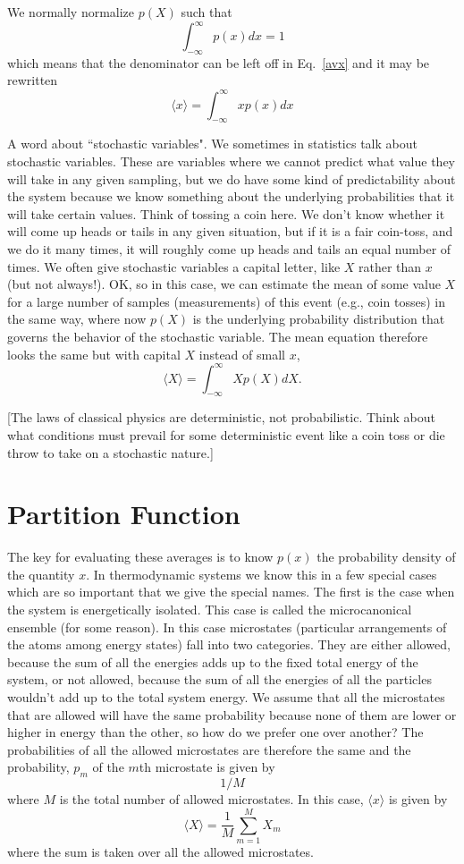 \documentclass[]{revtex4}
\newcommand{\sm}[1]{{\[#1\]}}
\begin{document}
We normally normalize $p(X)$ such that
\sm{\int_{-\infty}^{\infty} p(x)dx=1}
which means that the denominator can be left off in Eq.~\ref{avx} and it may be rewritten
\sm{\langle x\rangle={\int_{-\infty}^{\infty} xp(x)dx}}

A word about ``stochastic variables".  We sometimes in statistics talk about stochastic variables.  These are variables where we cannot predict
what value they will take in any given sampling, but we do have some kind of predictability about the system because we know something about the
underlying probabilities that it will take certain values.  Think of tossing a coin here.  We don't know whether it will come up heads or tails
in any given situation, but if it is a fair coin-toss, and we do it many times, it will roughly come up heads and tails an equal number of times.
We often give stochastic variables a capital letter, like $X$ rather than $x$ (but not always!). OK, so in this case, we can estimate the mean of
some value $X$ for a large number of samples (measurements) of this event (e.g., coin tosses) in the same way, where now $p(X)$ is the underlying
probability distribution that governs the behavior of the stochastic variable. The mean equation therefore looks the same but with capital $X$ instead
of small $x$,
\sm{\langle X\rangle={\int_{-\infty}^{\infty} Xp(X)dX}.}

[The laws of classical physics are deterministic, not probabilistic. Think about what conditions must prevail for some deterministic event like a coin
toss or die throw to take on a stochastic nature.]


\section*{Partition Function}
The key for evaluating these averages is to know $p(x)$ the probability density of the quantity $x$.  In thermodynamic systems we know this in a few special cases
which are so important that we give the special names.   The first is the case when the system is energetically isolated.  This case is called
the microcanonical ensemble (for some reason).  In this case microstates (particular arrangements of the atoms among energy states) fall into two categories.
They are either allowed, because the sum of all the energies adds up to the fixed total energy of the system, or not allowed, because the sum of all the energies
of all the particles wouldn't add up to the total system energy.  We assume that all the microstates that are allowed will have the same probability because none
of them are lower or higher in energy than the other, so how do we prefer one over another?  The probabilities of all the allowed microstates are therefore the same and
the probability, $p_m$ of the $m$th microstate is given by \sm{1/M} where $M$ is the total number of allowed microstates.  In this case, $\langle x\rangle$ is given
by
\sm{\langle X\rangle=\frac{1}{M}{\sum_{m=1}^{M} X_m}\label{microstates}}
where the sum is taken over all the allowed microstates.
\end{document}
